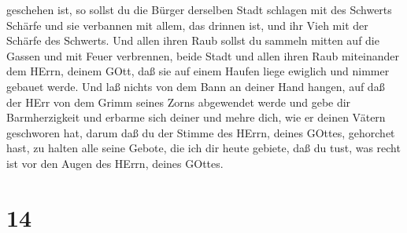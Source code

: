 geschehen ist,  so sollst du die Bürger derselben Stadt
schlagen mit des Schwerts Schärfe und sie verbannen mit allem, das
drinnen ist, und ihr Vieh mit der Schärfe des Schwerts. 
Und allen ihren Raub sollst du sammeln mitten auf die Gassen und mit
Feuer verbrennen, beide Stadt und allen ihren Raub miteinander dem
HErrn, deinem GOtt, daß sie auf einem Haufen liege ewiglich und nimmer
gebauet werde.  Und laß nichts von dem Bann an deiner Hand
hangen, auf daß der HErr von dem Grimm seines Zorns abgewendet werde und
gebe dir Barmherzigkeit und erbarme sich deiner und mehre dich, wie er
deinen Vätern geschworen hat,  darum daß du der Stimme des
HErrn, deines GOttes, gehorchet hast, zu halten alle seine Gebote, die
ich dir heute gebiete, daß du tust, was recht ist vor den Augen des
HErrn, deines GOttes.

\hypertarget{section-13}{%
\section{14}\label{section-13}}

